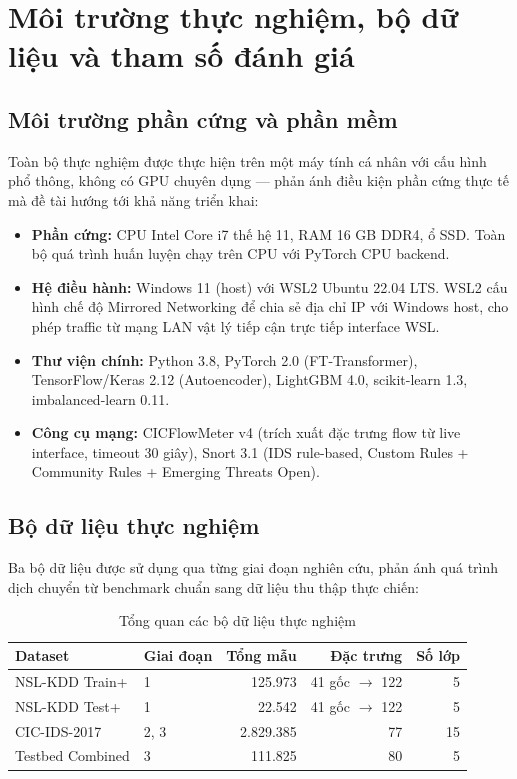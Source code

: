 \documentclass[../DoAn.tex]{subfiles}
\begin{document}
\section{Môi trường thực nghiệm, bộ dữ liệu và tham số đánh giá}
\label{sec:tn-moitruong}

\subsection{Môi trường phần cứng và phần mềm}
\label{subsec:tn-hardware}

Toàn bộ thực nghiệm được thực hiện trên một máy tính cá nhân với cấu hình phổ thông, không có GPU chuyên dụng --- phản ánh điều kiện phần cứng thực tế mà đề tài hướng tới khả năng triển khai:

\begin{itemize}
    \item \textbf{Phần cứng:} CPU Intel Core i7 thế hệ 11, RAM 16 GB DDR4, ổ SSD. Toàn bộ quá trình huấn luyện chạy trên CPU với PyTorch CPU backend.
    \item \textbf{Hệ điều hành:} Windows 11 (host) với WSL2 Ubuntu 22.04 LTS. WSL2 cấu hình chế độ Mirrored Networking để chia sẻ địa chỉ IP với Windows host, cho phép traffic từ mạng LAN vật lý tiếp cận trực tiếp interface WSL.
    \item \textbf{Thư viện chính:} Python 3.8, PyTorch 2.0 (FT-Transformer), TensorFlow/Keras 2.12 (Autoencoder), LightGBM 4.0, scikit-learn 1.3, imbalanced-learn 0.11.
    \item \textbf{Công cụ mạng:} CICFlowMeter v4 (trích xuất đặc trưng flow từ live interface, timeout 30 giây), Snort 3.1 (IDS rule-based, Custom Rules + Community Rules + Emerging Threats Open).
\end{itemize}

\subsection{Bộ dữ liệu thực nghiệm}
\label{subsec:tn-datasets}

Ba bộ dữ liệu được sử dụng qua từng giai đoạn nghiên cứu, phản ánh quá trình dịch chuyển từ benchmark chuẩn sang dữ liệu thu thập thực chiến:

\begin{table}[H]
    \centering
    \caption{Tổng quan các bộ dữ liệu thực nghiệm}
    \label{tab:datasets-overview}
    \begin{tabular}{llrrr}
        \hline
        \textbf{Dataset} & \textbf{Giai đoạn} & \textbf{Tổng mẫu} & \textbf{Đặc trưng} & \textbf{Số lớp} \\
        \hline
        NSL-KDD Train+  & 1 & 125.973 & 41 gốc $\to$ 122 & 5 \\
        NSL-KDD Test+   & 1 & 22.542  & 41 gốc $\to$ 122 & 5 \\
        CIC-IDS-2017    & 2, 3 & 2.829.385 & 77 & 15 \\
        Testbed Combined & 3 & 111.825 & 80 & 5 \\
        \hline
    \end{tabular}
\end{table}
\end{document}
